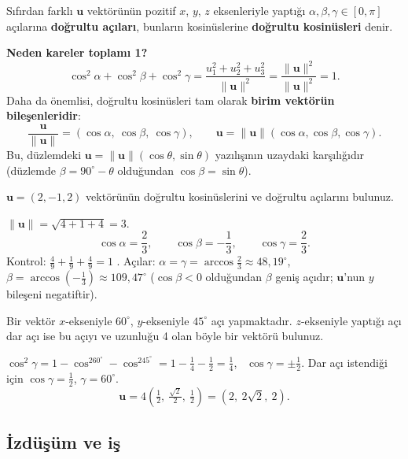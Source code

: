 \begin{tanim}
Sıfırdan farklı $\mathbf u$ vektörünün pozitif $x$, $y$, $z$ eksenleriyle yaptığı $\alpha,\beta,\gamma\in[0,\pi]$ açılarına \textbf{doğrultu açıları}, bunların kosinüslerine \textbf{doğrultu kosinüsleri} denir.
\end{tanim}

\textbf{Neden kareler toplamı 1?}
\[
\cos^2\alpha+\cos^2\beta+\cos^2\gamma=\frac{u_1^2+u_2^2+u_3^2}{\|\mathbf u\|^2}=\frac{\|\mathbf u\|^2}{\|\mathbf u\|^2}=1 .
\]
Daha da önemlisi, doğrultu kosinüsleri tam olarak \textbf{birim vektörün bileşenleridir}:
\[
\frac{\mathbf u}{\|\mathbf u\|}=(\cos\alpha,\ \cos\beta,\ \cos\gamma),\qquad
\mathbf u=\|\mathbf u\|(\cos\alpha,\cos\beta,\cos\gamma).
\]
Bu, düzlemdeki $\mathbf u=\|\mathbf u\|(\cos\theta,\sin\theta)$ yazılışının uzaydaki karşılığıdır (düzlemde $\beta=90^\circ-\theta$ olduğundan $\cos\beta=\sin\theta$).

\begin{soru}
$\mathbf u=(2,-1,2)$ vektörünün doğrultu kosinüslerini ve doğrultu açılarını bulunuz.
\end{soru}
\begin{cevap}
$\|\mathbf u\|=\sqrt{4+1+4}=3$.
\[
\cos\alpha=\frac23,\qquad \cos\beta=-\frac13,\qquad \cos\gamma=\frac23 .
\]
Kontrol: $\frac49+\frac19+\frac49=1$ \checkmark. Açılar: $\alpha=\gamma=\arccos\frac23\approx48{,}19^\circ$, \ $\beta=\arccos\left(-\frac13\right)\approx109{,}47^\circ$ ($\cos\beta<0$ olduğundan $\beta$ geniş açıdır; $\mathbf u$'nun $y$ bileşeni negatiftir).
\end{cevap}

\begin{soru}
Bir vektör $x$-ekseniyle $60^\circ$, $y$-ekseniyle $45^\circ$ açı yapmaktadır. $z$-ekseniyle yaptığı açı dar açı ise bu açıyı ve uzunluğu 4 olan böyle bir vektörü bulunuz.
\end{soru}
\begin{cevap}
$\cos^2\gamma=1-\cos^260^\circ-\cos^245^\circ=1-\frac14-\frac12=\frac14$, \ $\cos\gamma=\pm\frac12$. Dar açı istendiği için $\cos\gamma=\frac12$, $\gamma=60^\circ$.
\[
\mathbf u=4\left(\tfrac12,\ \tfrac{\sqrt2}{2},\ \tfrac12\right)=(2,\ 2\sqrt2,\ 2).
\]
\end{cevap}

\subsection{İzdüşüm ve iş}

